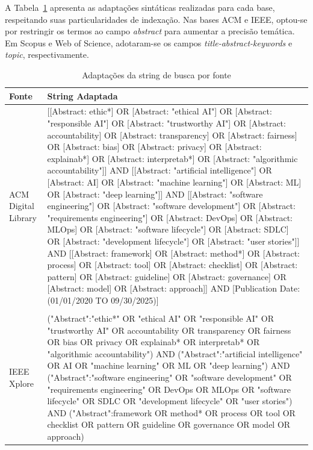 A Tabela~\ref{tab:strings} apresenta as adaptações sintáticas realizadas para cada base, respeitando suas particularidades de indexação. Nas bases ACM e IEEE, optou-se por restringir os termos ao campo \textit{abstract} para aumentar a precisão temática. Em Scopus e Web of Science, adotaram-se os campos \textit{title-abstract-keywords} e \textit{topic}, respectivamente.

\begin{table}[htbp]
 \centering
 \caption{Adaptações da string de busca por fonte}
 \label{tab:strings}
 \scriptsize
 \begin{tabular}{p{1.5cm}p{12.5cm}}
    \hline
    \textbf{Fonte} & \textbf{String Adaptada} \\
    \hline
    \addlinespace
    ACM Digital Library & [[Abstract: ethic*] OR [Abstract: "ethical AI"] OR [Abstract: "responsible AI"] OR [Abstract: "trustworthy AI"] OR [Abstract: accountability] OR [Abstract: transparency] OR [Abstract: fairness] OR [Abstract: bias] OR [Abstract: privacy] OR [Abstract: explainab*] OR [Abstract: interpretab*] OR [Abstract: "algorithmic accountability"]] AND [[Abstract: "artificial intelligence"] OR [Abstract: AI] OR [Abstract: "machine learning"] OR [Abstract: ML] OR [Abstract: "deep learning"]] AND [[Abstract: "software engineering"] OR [Abstract: "software development"] OR [Abstract: "requirements engineering"] OR [Abstract: DevOps] OR [Abstract: MLOps] OR [Abstract: "software lifecycle"] OR [Abstract: SDLC] OR  [Abstract: "development lifecycle"] OR [Abstract: "user stories"]] AND [[Abstract: framework] OR [Abstract: method*] OR [Abstract: process] OR [Abstract: tool] OR [Abstract: checklist] OR [Abstract: pattern] OR [Abstract: guideline] OR [Abstract: governance] OR [Abstract: model] OR [Abstract: approach]] AND [Publication Date: (01/01/2020 TO 09/30/2025)] \\
     \\
    \hline
    \addlinespace
    IEEE Xplore & ("Abstract":"ethic*" OR "ethical AI" OR "responsible AI" OR "trustworthy AI" OR accountability OR transparency OR fairness OR bias OR privacy OR explainab* OR interpretab* OR "algorithmic accountability") AND ("Abstract":"artificial intelligence" OR AI OR "machine learning" OR ML OR "deep learning") AND ("Abstract":"software engineering" OR "software development" OR "requirements engineering" OR DevOps OR MLOps OR "software lifecycle" OR SDLC OR "development lifecycle" OR "user stories") AND ("Abstract":framework OR method* OR process OR tool OR checklist OR pattern OR guideline OR governance OR model OR approach) \\

\end{tabular}
\end{table}
